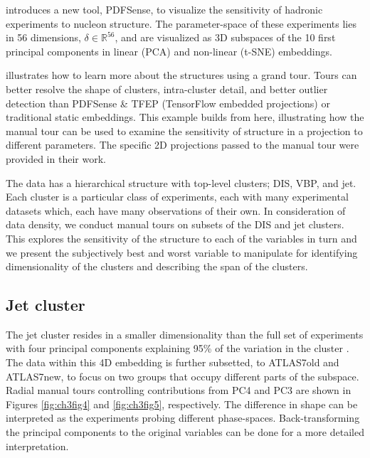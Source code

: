 \documentclass{monashthesis}
\begin{document}
\textcite{wang_mapping_2018} introduces a new tool, PDFSense, to visualize the sensitivity of hadronic experiments to nucleon structure. The parameter-space of these experiments lies in 56 dimensions, \(\delta \in \mathbb{R}^{56}\), and are visualized as 3D subspaces of the 10 first principal components in linear (PCA) and non-linear (t-SNE) embeddings.

\textcite{cook_dynamical_2018} illustrates how to learn more about the structures using a grand tour. Tours can better resolve the shape of clusters, intra-cluster detail, and better outlier detection than PDFSense \& TFEP (TensorFlow embedded projections) or traditional static embeddings. This example builds from here, illustrating how the manual tour can be used to examine the sensitivity of structure in a projection to different parameters. The specific 2D projections passed to the manual tour were provided in their work.

The data has a hierarchical structure with top-level clusters; DIS, VBP, and jet. Each cluster is a particular class of experiments, each with many experimental datasets which, each have many observations of their own. In consideration of data density, we conduct manual tours on subsets of the DIS and jet clusters. This explores the sensitivity of the structure to each of the variables in turn and we present the subjectively best and worst variable to manipulate for identifying dimensionality of the clusters and describing the span of the clusters.

\hypertarget{jet-cluster}{%
\subsection{Jet cluster}\label{jet-cluster}}

The jet cluster resides in a smaller dimensionality than the full set of experiments with four principal components explaining 95\% of the variation in the cluster \autocite{cook_dynamical_2018}. The data within this 4D embedding is further subsetted, to ATLAS7old and ATLAS7new, to focus on two groups that occupy different parts of the subspace. Radial manual tours controlling contributions from PC4 and PC3 are shown in Figures \ref{fig:ch3fig4} and \ref{fig:ch3fig5}, respectively. The difference in shape can be interpreted as the experiments probing different phase-spaces. Back-transforming the principal components to the original variables can be done for a more detailed interpretation.
\end{document}
